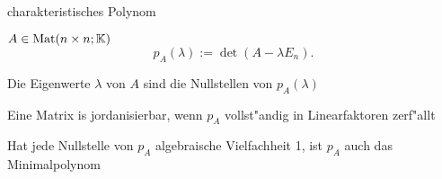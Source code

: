 \documentclass[class=article, crop=false]{standalone}
\begin{document}
\begin{zettel}{charakteristisches Polynom}
\begin{flashcard}
\begin{definition}
$A \in \operatorname{Mat}(n \times n; \mathbb{K}) $
\[
    p_{A}(\lambda ) := \det(A - \lambda E_{n})
.\]
\end{definition}
\end{flashcard}

Die Eigenwerte $\lambda$ von $A$ sind die Nullstellen von $p_{A}(\lambda)$ 

Eine Matrix is jordanisierbar, wenn $p_{A}$ vollst"andig in Linearfaktoren zerf"allt

Hat jede Nullstelle von $p_{A}$ algebraische Vielfachheit 1, ist $p_{A}$ auch das Minimalpolynom
\end{zettel}
\end{document}
